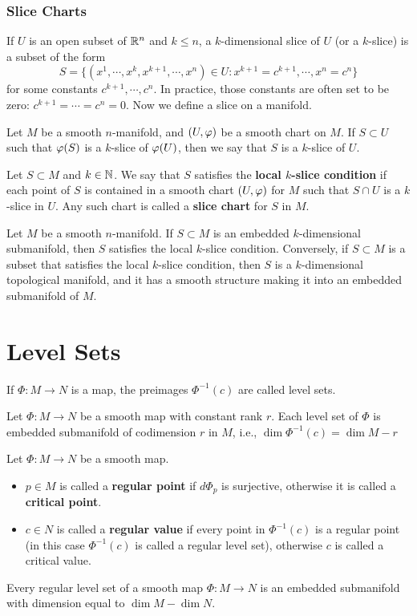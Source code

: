 \subsubsection*{Slice Charts}
If $U$ is an open subset of $\mathbb{R}^n$ and $k \leq n$, a $k$-dimensional slice of $U$ (or a $k$-slice) is a subset of the form
$$S = \{(x^1, \cdots, x^k, x^{k+1}, \cdots, x^n) \in U: x^{k+1} = c^{k+1}, \cdots, x^n = c^n\}$$
for some constants $c^{k+1}, \cdots, c^n$. In practice, those constants are often set to be zero: $c^{k+1} = \cdots = c^n = 0$. Now we define a slice on a manifold. 
\begin{definition}
    Let $M$ be a smooth $n$-manifold, and $(U,\varphi)$ be a smooth chart on $M$. If $S \subset U$ such that $\varphi(S)$ is a $k$-slice of $\varphi(U)$, then we say that $S$ is a $k$-slice of $U$. 
\end{definition}
\begin{definition}
    Let $S \subset M$ and $k \in \mathbb{N}$. We say that $S$ satisfies the \textbf{local $k$-slice condition} if each point of $S$ is contained in a smooth chart $(U,\varphi)$ for $M$ such that $S \cap U$ is a $k$-slice in $U$. Any such chart is called a \textbf{slice chart} for $S$ in $M$. 
\end{definition}
\begin{theorem}
    Let $M$ be a smooth $n$-manifold. If $S \subset M$ is an embedded $k$-dimensional submanifold, then $S$ satisfies the local $k$-slice condition. Conversely, if $S \subset M$ is a subset that satisfies the local $k$-slice condition, then $S$ is a $k$-dimensional topological manifold, and it has a smooth structure making it into an embedded submanifold of $M$. 
\end{theorem}

\section{Level Sets}
If $\Phi:M \to N$ is a map, the preimages $\Phi^{-1}(c)$ are called level sets. 
\begin{theorem}
    Let $\Phi:M \to N$ be a smooth map with constant rank $r$. Each level set of $\Phi$ is embedded submanifold of codimension $r$ in $M$, i.e., $\dim \Phi^{-1}(c) = \dim M - r$
\end{theorem}

Let $\Phi:M \to N$ be a smooth map. 
\begin{itemize}
    \item $p \in M$ is called a \textbf{regular point} if $d\Phi_p$ is surjective, otherwise it is called a \textbf{critical point}.
    \item $c \in N$ is called a \textbf{regular value} if every point in $\Phi^{-1}(c)$ is a regular point (in this case $\Phi^{-1}(c)$ is called a regular level set), otherwise $c$ is called a critical value. 
\end{itemize}
\begin{corollary}
    Every regular level set of a smooth map $\Phi:M \to N$ is an embedded submanifold with dimension equal to $\dim M - \dim N$. 
\end{corollary}

